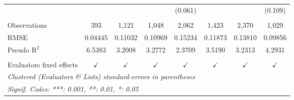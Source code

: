 \begin{tabular}{lccccccc}
                            &               &               &               & (0.061)       &               &                & (0.109)\\   
    \\
   Observations             & 393           & 1,121         & 1,048         & 2,062         & 1,423         & 2,370          & 1,029\\  
   RMSE                     & 0.04445       & 0.11032       & 0.10969       & 0.15234       & 0.11873       & 0.13810        & 0.09856\\  
   Pseudo R$^2$             & 6.5383        & 3.2008        & 3.2772        & 2.3709        & 3.5190        & 3.2313         & 4.2931\\  
    \\
   Evaluators fixed effects & $\checkmark$  & $\checkmark$  & $\checkmark$  & $\checkmark$  & $\checkmark$  & $\checkmark$   & $\checkmark$\\   
   \bottomrule
   \multicolumn{8}{l}{\emph{Clustered (Evaluators \& Lists) standard-errors in parentheses}}\\
   \multicolumn{8}{l}{\emph{Signif. Codes: ***: 0.001, **: 0.01, *: 0.05}}\\
\end{tabular}
\par\endgroup


